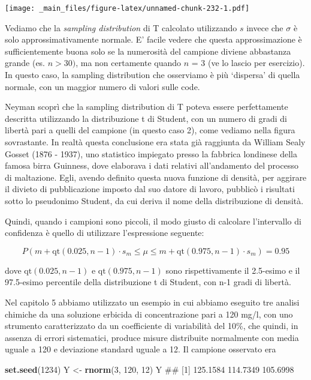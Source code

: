 \documentclass[a4paper,12pt,oneside]{book}
\newenvironment{Shaded}{\begin{snugshade}}{\end{snugshade}}
\newcommand{\KeywordTok}[1]{\textcolor[rgb]{0.13,0.29,0.53}{\textbf{#1}}}
\newcommand{\DecValTok}[1]{\textcolor[rgb]{0.00,0.00,0.81}{#1}}
\newcommand{\StringTok}[1]{\textcolor[rgb]{0.31,0.60,0.02}{#1}}
\newcommand{\NormalTok}[1]{#1}
\theoremstyle{definition}
\theoremstyle{definition}
\theoremstyle{definition}
\theoremstyle{remark}
\begin{document}
\texttt{[image: \_main\_files/figure-latex/unnamed-chunk-232-1.pdf]}

Vediamo che la \emph{sampling distribution} di T calcolato utilizzando
\(s\) invece che \(\sigma\) è solo approssimativamente normale. E'
facile vedere che questa approssimazione è sufficientemente buona solo
se la numerosità del campione diviene abbastanza grande (es.
\(n > 30)\), ma non certamente quando \(n\) = 3 (ve lo lascio per
esercizio). In questo caso, la sampling distribution che osserviamo è
più `dispersa' di quella normale, con un maggior numero di valori sulle
code.

Neyman scoprì che la sampling distribution di T poteva essere
perfettamente descritta utilizzando la distribuzione t di Student, con
un numero di gradi di libertà pari a quelli del campione (in questo caso
2), come vediamo nella figura sovrastante. In realtà questa conclusione
era stata già raggiunta da William Sealy Gosset (1876 - 1937), uno
statistico impiegato presso la fabbrica londinese della famosa birra
Guinness, dove elaborava i dati relativi all'andamento del processo di
maltazione. Egli, avendo definito questa nuova funzione di densità, per
aggirare il divieto di pubblicazione imposto dal suo datore di lavoro,
pubblicò i risultati sotto lo pseudonimo Student, da cui deriva il nome
della distribuzione di densità.

Quindi, quando i campioni sono piccoli, il modo giusto di calcolare
l'intervallo di confidenza è quello di utilizzare l'espressione
seguente:

\[P \left( m + \textrm{qt}(0.025,n - 1) \cdot s_m \le \mu  \le m + \textrm{qt}(0.975,n - 1) \cdot s_m \right) = 0.95\]

dove \(\textrm{qt}(0.025,n - 1)\) e \(\textrm{qt}(0.975,n - 1)\) sono
rispettivamente il 2.5-esimo e il 97.5-esimo percentile della
distribuzione t di Student, con n-1 gradi di libertà.

Nel capitolo 5 abbiamo utilizzato un esempio in cui abbiamo eseguito tre
analisi chimiche da una soluzione erbicida di concentrazione pari a 120
mg/l, con uno strumento caratterizzato da un coefficiente di variabilità
del 10\%, che quindi, in assenza di errori sistematici, produce misure
distribuite normalmente con media uguale a 120 e deviazione standard
uguale a 12. Il campione osservato era

\begin{Shaded}
\begin{Highlighting}[]
\KeywordTok{set.seed}\NormalTok{(}\DecValTok{1234}\NormalTok{)}
\NormalTok{Y <-}\StringTok{ }\KeywordTok{rnorm}\NormalTok{(}\DecValTok{3}\NormalTok{, }\DecValTok{120}\NormalTok{, }\DecValTok{12}\NormalTok{)}
\NormalTok{Y}
\NormalTok{## [1] 125.1584 114.7349 105.6998}
\end{Highlighting}
\end{Shaded}
\end{document}
